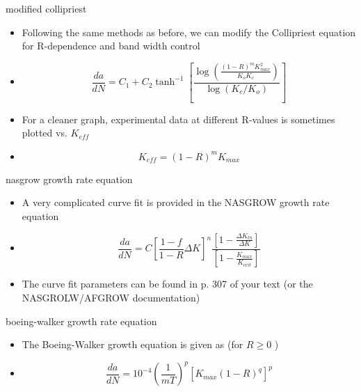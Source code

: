 \documentclass[10pt]{beamer}
\begin{document}
\begin{frame}{modified collipriest}
	\begin{itemize}[<+->]
		\item Following the same methods as before, we can modify the Collipriest equation for R-dependence and band width control
		\item [] \begin{equation}
		\frac{da}{dN} = C_1 + C_2 \tanh^{-1} \left[\frac{\log \left(\frac{(1-R)^mK_{max}^2}{K_oK_c}\right)}{\log (K_c/K_o)}\right]
		\end{equation}
		\item For a cleaner graph, experimental data at different R-values is sometimes plotted vs. $K_{eff}$
		\item[] \begin{equation}
		K_{eff} = (1-R)^m K_{max}
		\end{equation}
	\end{itemize}
\end{frame}

\begin{frame}{nasgrow growth rate equation}
	\begin{itemize}[<+->]
		\item A very complicated curve fit is provided in the NASGROW growth rate equation
		\item[] \begin{equation}
		\frac{da}{dN} = C \left[\frac{1-f}{1-R}\Delta K\right]^n\frac{\left[1-\frac{\Delta K_{th}}{\Delta K}\right]}{\left[1-\frac{K_{max}}{K_{crit}}\right]}
		\end{equation}
		\item The curve fit parameters can be found in p. 307 of your text (or the NASGROLW/AFGROW documentation)
	\end{itemize}
\end{frame}

\begin{frame}{boeing-walker growth rate equation}
	\begin{itemize}[<+->]
		\item The Boeing-Walker growth equation is given as (for $R \ge 0$ )
		\item[] \begin{equation}
		\frac{da}{dN} = 10^{-4}\left(\frac{1}{mT}\right)^p\left[K_{max}(1-R)^q\right]^p
		\end{equation}
	\end{itemize}
\end{frame}
\end{document}
